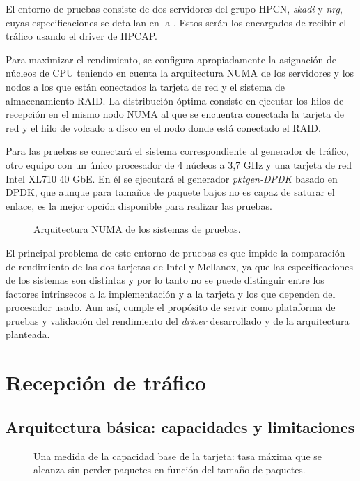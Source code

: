 \documentclass[twoside, 12pt, draft]{epstfg}
\begin{document}
El entorno de pruebas consiste de dos servidores del grupo HPCN, \textit{skadi} y \textit{nrg}, cuyas especificaciones se detallan en la . Estos serán los encargados de recibir el tráfico usando el driver de HPCAP.

Para maximizar el rendimiento, se configura apropiadamente la asignación de núcleos de CPU teniendo en cuenta la arquitectura \gls{NUMA} de los servidores y los nodos a los que están conectados la tarjeta de red y el sistema de almacenamiento RAID. La distribución óptima \cite{m3omon} consiste en ejecutar los hilos de recepción en el mismo nodo NUMA al que se encuentra conectada la tarjeta de red y el hilo de volcado a disco en el nodo donde está conectado el RAID.

Para las pruebas se conectará el sistema correspondiente al generador de tráfico, otro equipo con un único procesador de 4 núcleos a 3,7 GHz y una tarjeta de red Intel XL710 40 GbE. En él se ejecutará el generador \textit{pktgen-DPDK} basado en DPDK, que aunque para tamaños de paquete bajos no es capaz de saturar el enlace, es la mejor opción disponible para realizar las pruebas.

\begin{figure}[tbp]
\centering
\footnotesize

\caption{Arquitectura NUMA de los sistemas de pruebas.}
\label{fig:Validacion:NUMAArch}
\end{figure}

El principal problema de este entorno de pruebas es que impide la comparación de rendimiento de las dos tarjetas de Intel y Mellanox, ya que las especificaciones de los sistemas son distintas y por lo tanto no se puede distinguir entre los factores intrínsecos a la implementación y a la tarjeta y los que dependen del procesador usado. Aun así, cumple el propósito de servir como plataforma de pruebas y validación del rendimiento del \textit{driver} desarrollado y de la arquitectura planteada.

\section{Recepción de tráfico}

\subsection{Arquitectura básica: capacidades y limitaciones}

\begin{figure}[htbp]
\caption[Capacidad de una arquitectura básica de captura]{Una medida de la capacidad base de la tarjeta: tasa máxima que se alcanza sin perder paquetes en función del tamaño de paquetes.}
\label{fig:Validacion:SimpleArchRate}
\end{figure}
\end{document}
